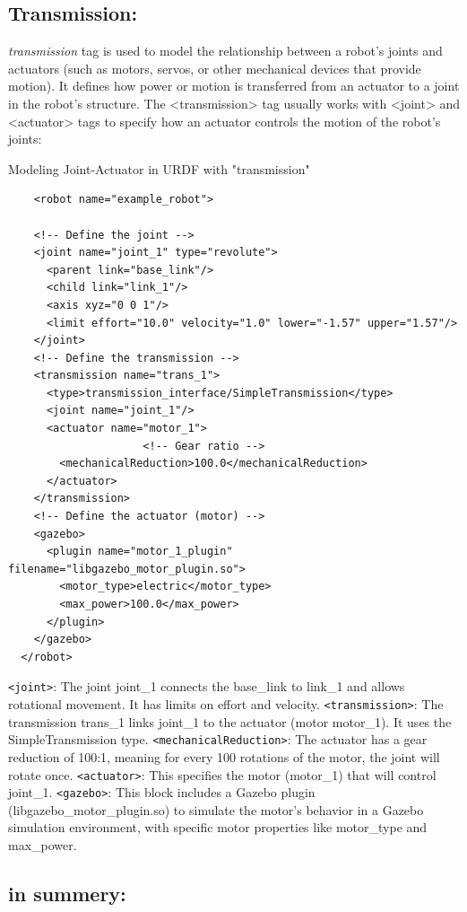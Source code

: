 \documentclass[../../main]{subfiles}
\begin{document}
\subsection{Transmission:}
\emph{transmission} tag is used to model the relationship between a robot's joints and actuators 
(such as motors, servos, or other mechanical devices that provide motion). 
It defines how power or motion is transferred from an actuator to a joint in the robot's structure.
The <transmission> tag usually works with <joint> and <actuator> tags to specify how an actuator controls the motion of the robot's joints:
\begin{codebox}[]{Modeling Joint-Actuator in URDF with "transmission"}
  \begin{verbatim}
    <robot name="example_robot">

    <!-- Define the joint -->
    <joint name="joint_1" type="revolute">
      <parent link="base_link"/>
      <child link="link_1"/>
      <axis xyz="0 0 1"/>
      <limit effort="10.0" velocity="1.0" lower="-1.57" upper="1.57"/>
    </joint>
    <!-- Define the transmission -->
    <transmission name="trans_1">
      <type>transmission_interface/SimpleTransmission</type>
      <joint name="joint_1"/>
      <actuator name="motor_1">
                     <!-- Gear ratio -->
        <mechanicalReduction>100.0</mechanicalReduction>
      </actuator>
    </transmission>
    <!-- Define the actuator (motor) -->
    <gazebo>
      <plugin name="motor_1_plugin" filename="libgazebo_motor_plugin.so">
        <motor_type>electric</motor_type>
        <max_power>100.0</max_power>
      </plugin>
    </gazebo>
  </robot>
\end{verbatim}
  \end{codebox}
\lstinline!<joint>!: The joint joint\_1 connects the base\_link to link\_1 and allows rotational movement. 
It has limits on effort and velocity.
\lstinline!<transmission>!: The transmission trans\_1 links joint\_1 to the actuator (motor motor\_1). It uses the SimpleTransmission type.
\lstinline!<mechanicalReduction>!: The actuator has a gear reduction of 100:1, meaning for every 100 rotations of the motor, the joint will rotate once.
\lstinline!<actuator>!: This specifies the motor (motor\_1) that will control joint\_1.
\lstinline!<gazebo>!: This block includes a Gazebo plugin (libgazebo\_motor\_plugin.so) to simulate the motor’s behavior in a Gazebo simulation environment, with specific motor properties like motor\_type and max\_power.

\subsection*{in summery:}
\end{document}
